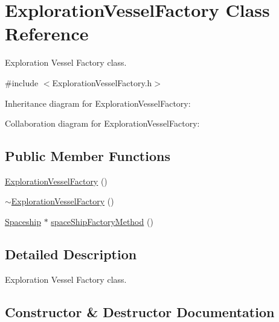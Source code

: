 \hypertarget{classExplorationVesselFactory}{}\section{Exploration\+Vessel\+Factory Class Reference}
\label{classExplorationVesselFactory}


Exploration Vessel Factory class.  




{\ttfamily \#include $<$Exploration\+Vessel\+Factory.\+h$>$}



Inheritance diagram for Exploration\+Vessel\+Factory\+:


Collaboration diagram for Exploration\+Vessel\+Factory\+:
\subsection*{Public Member Functions}
\begin{DoxyCompactItemize}
\item 
\hyperlink{classExplorationVesselFactory_a4cf974e1ad11c9597a5cd7546a199ded}{Exploration\+Vessel\+Factory} ()
\item 
\hyperlink{classExplorationVesselFactory_a52d1a2adb9d442c82a253de5d68e7b08}{$\sim$\+Exploration\+Vessel\+Factory} ()
\item 
\hyperlink{classSpaceship}{Spaceship} $\ast$ \hyperlink{classExplorationVesselFactory_a3a139abf87097903138688d662700a65}{space\+Ship\+Factory\+Method} ()
\end{DoxyCompactItemize}


\subsection{Detailed Description}
Exploration Vessel Factory class. 

\subsection{Constructor \& Destructor Documentation}
\mbox{\label{classExplorationVesselFactory_a4cf974e1ad11c9597a5cd7546a199ded}} 
